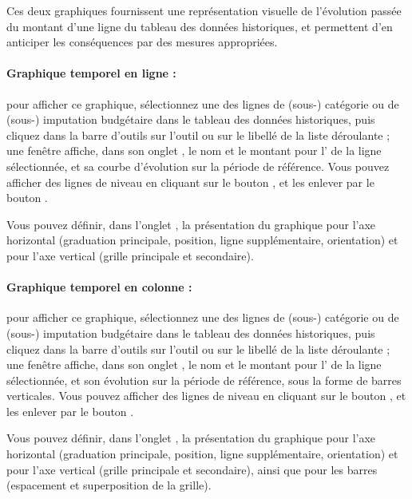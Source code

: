 Ces deux graphiques fournissent une représentation visuelle de l'évolution passée du montant  d'une ligne du tableau des données historiques, et permettent d'en anticiper les conséquences par des mesures appropriées.

\paragraph{Graphique temporel en ligne :} pour afficher ce graphique, sélectionnez une des lignes de (sous-) catégorie ou de (sous-) imputation budgétaire dans le tableau des données historiques, puis cliquez dans la barre d'outils sur l'outil  ou sur le libellé  de la liste déroulante ; une fenêtre affiche, dans son onglet , le nom et le montant pour l' de la ligne sélectionnée, et sa courbe d'évolution sur la période de référence. Vous pouvez afficher des lignes de niveau en cliquant sur le bouton , et les enlever par le bouton . 

Vous pouvez définir, dans l'onglet , la présentation du graphique pour l'axe horizontal (graduation principale, position, ligne supplémentaire, orientation) et pour l'axe vertical (grille principale et secondaire). 

\paragraph{Graphique temporel en colonne :} pour afficher ce graphique, sélectionnez une des lignes de (sous-) catégorie ou de (sous-) imputation budgétaire dans le tableau des données historiques, puis cliquez dans la barre d'outils sur l'outil  ou sur le libellé  de la liste déroulante ; une fenêtre affiche, dans son onglet , le nom et le montant pour l' de la ligne sélectionnée, et son évolution sur la période de référence, sous la forme de barres verticales. Vous pouvez afficher des lignes de niveau en cliquant sur le bouton , et les enlever par le bouton .

Vous pouvez définir, dans l'onglet , la présentation du graphique pour l'axe horizontal (graduation principale, position, ligne supplémentaire, orientation) et pour l'axe vertical (grille principale et secondaire), ainsi que pour les barres (espacement et superposition de la grille).


